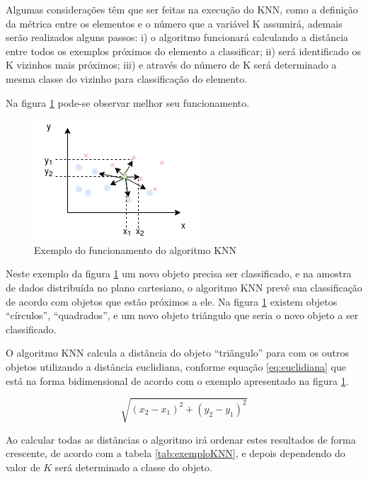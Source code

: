 Algumas considerações têm que ser feitas na execução do KNN, como a definição da métrica entre os elementos e o número que a variável K assumirá, ademais serão realizados alguns passos: i) o algoritmo funcionará calculando a distância entre todos os exemplos próximos do elemento a classificar; ii) será identificado os K vizinhos mais próximos; iii) e através do número de K será determinado a mesma classe do vizinho para classificação do elemento. 

Na figura \ref{fig:knn} pode-se observar melhor seu funcionamento.

\begin{figure}[h!]
    \centering
    \includegraphics[scale=0.9]{figs/ex_knn1.png}
    
    
    \caption{Exemplo do funcionamento do algoritmo KNN} 
    \label{fig:knn}     
\end{figure}

Neste exemplo da figura \ref{fig:knn} um novo objeto precisa ser classificado, e na amostra de dados distribuída no plano cartesiano, o algoritmo KNN prevê sua classificação de acordo com objetos que estão próximos a ele. Na figura \ref{fig:knn} existem objetos ``círculos'', ``quadrados'', e um novo objeto triângulo que seria o novo objeto a ser classificado. 

O algoritmo KNN calcula a distância do objeto ``triângulo'' para com os outros objetos utilizando a distância euclidiana, conforme equação \ref{eq:euclidiana} que está na forma bidimensional de acordo com o exemplo apresentado na figura \ref{fig:knn}.

\begin{equation}
 \sqrt{(x_2-x_1)^2 + (y_2-y_1)^2}
 \label{eq:euclidiana}
\end{equation}

Ao calcular todas as distâncias o algoritmo irá ordenar estes resultados de forma crescente, de acordo com a tabela \ref{tab:exemploKNN}, e depois dependendo do valor de ${K}$ será determinado a classe do objeto.


